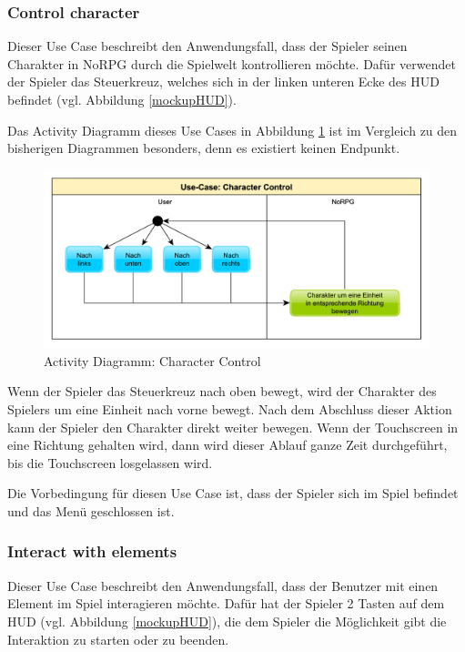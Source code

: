 		\subsubsection{Control character}
			Dieser Use Case beschreibt den Anwendungsfall, dass der Spieler seinen Charakter in NoRPG durch die Spielwelt kontrollieren möchte. Dafür verwendet der Spieler das Steuerkreuz, welches sich in der linken unteren Ecke des \ac{HUD} befindet (vgl. Abbildung \ref{mockupHUD}).
			
			Das Activity Diagramm dieses Use Cases in Abbildung \ref{umlControl} ist im Vergleich zu den bisherigen Diagrammen besonders, denn es existiert keinen Endpunkt. 
			
			\begin{figure}[htbp]
				\centering 
				\label{umlControl}
				\includegraphics[width=13cm]{pics/CharacterControl.pdf}
				\caption{Activity Diagramm: Character Control}
			\end{figure}
		
			Wenn der Spieler das Steuerkreuz nach oben bewegt, wird der Charakter des Spielers um eine Einheit nach vorne bewegt. Nach dem Abschluss dieser Aktion kann der Spieler den Charakter direkt weiter bewegen. Wenn der Touchscreen in eine Richtung gehalten wird, dann wird dieser Ablauf ganze Zeit durchgeführt, bis die Touchscreen losgelassen wird.
			
			Die Vorbedingung für diesen Use Case ist, dass der Spieler sich im Spiel befindet und das Menü geschlossen ist.
	
		\subsubsection{Interact with elements}
			Dieser Use Case beschreibt den Anwendungsfall, dass der Benutzer mit einen Element im Spiel interagieren möchte. Dafür hat der Spieler 2 Tasten auf dem \ac{HUD} (vgl. Abbildung \ref{mockupHUD}), die dem Spieler die Möglichkeit gibt die Interaktion zu starten oder zu beenden.
			
